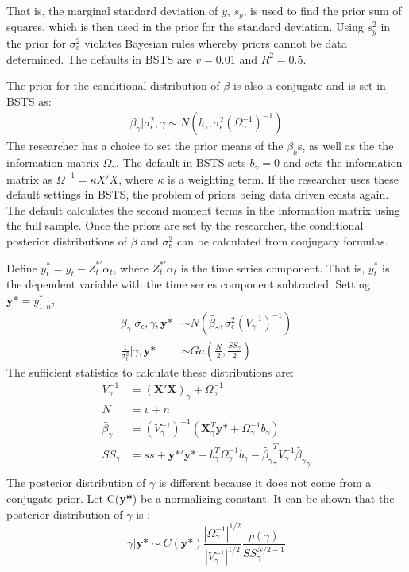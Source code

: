 That is, the marginal standard deviation of $y$, $s_{y}$, is used to find the prior sum of squares, which is then used in the prior for the standard deviation. Using $s_{y}^{2}$ in the prior for $\sigma_{\epsilon}^{2}$ violates Bayesian rules whereby priors cannot be data determined. The defaults in BSTS are $v = 0.01$ and $R^{2}=0.5$. 

The prior for the conditional distribution of $\beta$ is also a conjugate and is set in BSTS as:
\begin{align*}
\beta_{\gamma} | \sigma_{\epsilon}^{2} , \gamma \sim N(b_{\gamma}, \sigma_{\epsilon}^{2}(\Omega_{\gamma}^{-1})^{-1}) 
\end{align*}
The researcher has a choice to set the prior means of the $\beta_{k}$s, as well as the the information matrix $\Omega_{\gamma}$. The default in BSTS sets $b_{\gamma}=0$ and sets the information matrix as $\Omega^{-1}=\kappa {X'X}$, where $\kappa$ is a weighting term. If the researcher uses these default settings in BSTS, the problem of priors being data driven exists again. The default calculates the second moment terms in the information matrix using the full sample. Once the priors are set by the researcher, the conditional posterior distributions of $\beta$ and $\sigma_{\epsilon}^{2}$ can be calculated from conjugacy formulas. 

Define $y_{t}^*= y_{t} - Z_{t}^{*'}\alpha_{t}$, where $Z_{t}^{*'}\alpha_{t}$ is the time series component. That is, $y_{t}^{*}$ is the dependent variable with the time series component subtracted. Setting $\textbf{y*}=y^{*}_{1:n}$,
\begin{align*}
\beta_{\gamma} | \sigma_{\epsilon}, \gamma, \textbf{y*} &\sim N(\tilde{\beta_{\gamma}}, \sigma_{\epsilon}^{2}(V_{\gamma}^{-1})^{-1})\\
\frac{1}{ \sigma_{\epsilon}^{2}} | \gamma, \textbf{y*} &\sim Ga(\frac{N}{2}, \frac{SS_{\gamma}}{2})
\end{align*}
The sufficient statistics to calculate these distributions are:
\begin{align*}
V_{\gamma}^{-1} &= (\textbf{X}'\textbf{X})_{\gamma} + \Omega_{\gamma}^{-1}\\
N &= v + n\\
\tilde{\beta_{\gamma}} &= (V_{\gamma}^{-1})^{-1}(\textbf{X}_{\gamma}^{T}\textbf{y*} + \Omega_{\gamma}^{-1}b_{\gamma})\\
SS_{\gamma} &= ss + \textbf{y*}'\textbf{y*} + b_{\gamma}^{T} \Omega_{\gamma}^{-1} b_{\gamma} -  \tilde{\beta_{\gamma}}_{\gamma}^{T} V_{\gamma}^{-1}  \tilde{\beta_{\gamma}}_{\gamma}\\
\end{align*}
The posterior distribution of $\gamma$ is different because it does not come from a conjugate prior. Let C(\textbf{y*}) be a normalizing constant. It can be shown that the posterior distribution of $\gamma$ is \cite{bstspaper}:
$$ \gamma | \textbf{y*} \sim C(\textbf{y*}) \frac { |\Omega_{\gamma}^{-1}|^{1/2}} {|V_{\gamma}^{-1}|^{1/2}} \frac{p(\gamma)}{SS_{\gamma}^{N/2 - 1}}$$\\
 
